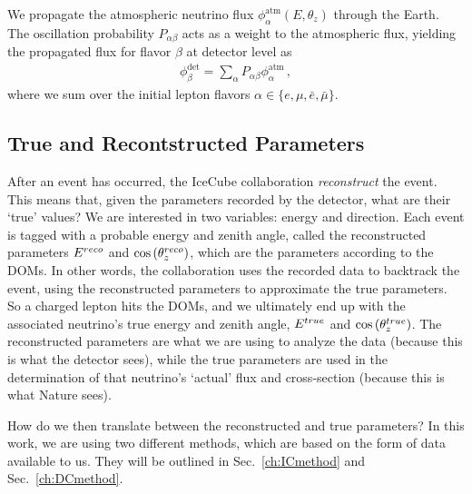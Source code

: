We propagate the atmospheric neutrino flux $\phi_\alpha^\text{atm}(E,\theta_z)$ through the Earth.
The oscillation probability $P_{\alpha \beta}$ acts as a weight to the atmospheric flux, yielding the propagated flux for flavor $\beta$ at detector level as 
\begin{align}\label{eq:propFlux}
    \phi_\beta^\text{det} = \sum_\alpha P_{\alpha\beta} \phi_\alpha^\text{atm} \,,
\end{align}
where we sum over the initial lepton flavors $\alpha \in \{e,\mu, \bar{e}, \bar{\mu}\}$.

\subsection{True and Recontstructed Parameters}
After an event has occurred, the IceCube collaboration \emph{reconstruct} the event. 
This means that, given the parameters recorded by the detector, what are their `true' values?
We are interested in two variables: energy and direction. Each event is tagged with a probable energy and zenith angle, 
called the reconstructed parameters $E^{reco}$ and $\cos{(\theta_z^{reco})}$, which are the parameters according to the DOMs.
In other words, the collaboration uses the recorded data to backtrack the event, using the reconstructed parameters to approximate the true parameters. 
So a charged lepton hits the DOMs, and we ultimately end up with the associated neutrino's true energy and zenith angle, $E^{true}$ and $\cos{(\theta_z^{true})}$. 
The reconstructed parameters are what we are using to analyze the data (because this is what the detector sees), while the true parameters are used in the 
determination of that neutrino's `actual' flux and cross-section (because this is what Nature sees).

How do we then translate between the reconstructed and true parameters? 
In this work, we are using two different methods, which are based on the form of data available to us. 
They will be outlined in Sec.~\ref{ch:ICmethod} and Sec.~\ref{ch:DCmethod}.



% 
% 
% 